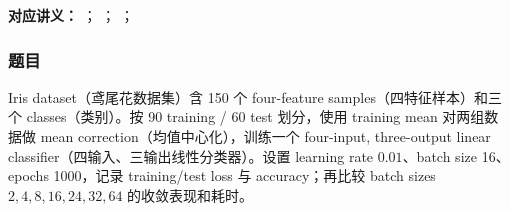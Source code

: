 
\textbf{对应讲义：}
；
；
；

\subsubsection*{题目}

Iris dataset（鸢尾花数据集）含 150 个 four-feature samples（四特征样本）和三个 classes（类别）。按 90 training / 60 test 划分，使用 training mean 对两组数据做 mean correction（均值中心化），训练一个 four-input, three-output linear classifier（四输入、三输出线性分类器）。设置 learning rate $0.01$、batch size 16、epochs 1000，记录 training/test loss 与 accuracy；再比较 batch sizes $2,4,8,16,24,32,64$ 的收敛表现和耗时。

